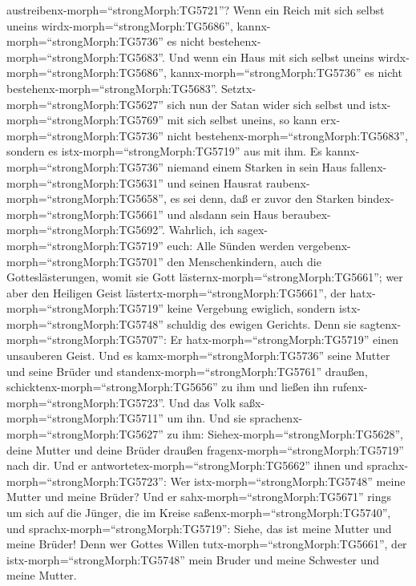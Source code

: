austreibenx-morph=``strongMorph:TG5721''?  Wenn ein Reich
mit sich selbst uneins wirdx-morph=``strongMorph:TG5686'',
kannx-morph=``strongMorph:TG5736'' es nicht
bestehenx-morph=``strongMorph:TG5683''.  Und wenn ein Haus
mit sich selbst uneins wirdx-morph=``strongMorph:TG5686'',
kannx-morph=``strongMorph:TG5736'' es nicht
bestehenx-morph=``strongMorph:TG5683''. 
Setztx-morph=``strongMorph:TG5627'' sich nun der Satan wider sich selbst
und istx-morph=``strongMorph:TG5769'' mit sich selbst uneins, so kann
erx-morph=``strongMorph:TG5736'' nicht
bestehenx-morph=``strongMorph:TG5683'', sondern es
istx-morph=``strongMorph:TG5719'' aus mit ihm.  Es
kannx-morph=``strongMorph:TG5736'' niemand einem Starken in sein Haus
fallenx-morph=``strongMorph:TG5631'' und seinen Hausrat
raubenx-morph=``strongMorph:TG5658'', es sei denn, daß er zuvor den
Starken bindex-morph=``strongMorph:TG5661'' und alsdann sein Haus
beraubex-morph=``strongMorph:TG5692''.  Wahrlich, ich
sagex-morph=``strongMorph:TG5719'' euch: Alle Sünden werden
vergebenx-morph=``strongMorph:TG5701'' den Menschenkindern, auch die
Gotteslästerungen, womit sie Gott lästernx-morph=``strongMorph:TG5661'';
 wer aber den Heiligen Geist
lästertx-morph=``strongMorph:TG5661'', der
hatx-morph=``strongMorph:TG5719'' keine Vergebung ewiglich, sondern
istx-morph=``strongMorph:TG5748'' schuldig des ewigen Gerichts.
 Denn sie sagtenx-morph=``strongMorph:TG5707'': Er
hatx-morph=``strongMorph:TG5719'' einen unsauberen Geist. 
Und es kamx-morph=``strongMorph:TG5736'' seine Mutter und seine Brüder
und standenx-morph=``strongMorph:TG5761'' draußen,
schicktenx-morph=``strongMorph:TG5656'' zu ihm und ließen ihn
rufenx-morph=``strongMorph:TG5723''.  Und das Volk
saßx-morph=``strongMorph:TG5711'' um ihn. Und sie
sprachenx-morph=``strongMorph:TG5627'' zu ihm:
Siehex-morph=``strongMorph:TG5628'', deine Mutter und deine Brüder
draußen fragenx-morph=``strongMorph:TG5719'' nach dir.  Und
er antwortetex-morph=``strongMorph:TG5662'' ihnen und
sprachx-morph=``strongMorph:TG5723'': Wer
istx-morph=``strongMorph:TG5748'' meine Mutter und meine Brüder?
 Und er sahx-morph=``strongMorph:TG5671'' rings um sich auf
die Jünger, die im Kreise saßenx-morph=``strongMorph:TG5740'', und
sprachx-morph=``strongMorph:TG5719'': Siehe, das ist meine Mutter und
meine Brüder!  Denn wer Gottes Willen
tutx-morph=``strongMorph:TG5661'', der istx-morph=``strongMorph:TG5748''
mein Bruder und meine Schwester und meine Mutter.

